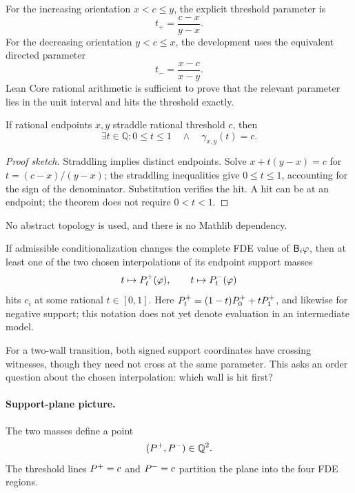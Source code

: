 For the increasing orientation \(x<c\le y\), the explicit threshold parameter is
\[
  t_+=\frac{c-x}{y-x}.
\]
For the decreasing orientation \(y<c\le x\), the development uses the equivalent directed parameter
\[
  t_- =\frac{x-c}{x-y}.
\]
Lean Core rational arithmetic is sufficient to prove that the relevant parameter lies in the unit interval and hits the threshold exactly.

\begin{theorem}
If rational endpoints \(x,y\) straddle rational threshold \(c\), then
\[
  \exists t\in\mathbb{Q}:
  0\le t\le 1
  \quad\land\quad
  \gamma_{x,y}(t)=c.
\]
\statusverified
\end{theorem}

\begin{proof}[Proof sketch]
Straddling implies distinct endpoints. Solve \(x+t(y-x)=c\) for \(t=(c-x)/(y-x)\); the straddling inequalities give \(0\le t\le1\), accounting for the sign of the denominator. Substitution verifies the hit. A hit can be at an endpoint; the theorem does not require \(0<t<1\).
\end{proof}
No abstract topology is used, and there is no Mathlib dependency.

\begin{corollary}
If admissible conditionalization changes the complete FDE value of \(\mathsf{B}_i\varphi\), then at least one of the two chosen interpolations of its endpoint support masses
\[
  t\mapsto P^{+}_t(\varphi),
  \qquad
  t\mapsto P^{-}_t(\varphi)
\]
hits \(c_i\) at some rational \(t\in[0,1]\). Here \(P^{+}_t=(1-t)P^{+}_0+tP^{+}_1\), and likewise for negative support; this notation does not yet denote evaluation in an intermediate model.
\statusverified
\end{corollary}

For a two-wall transition, both signed support coordinates have crossing witnesses, though they need not cross at the same parameter. This asks an order question about the chosen interpolation: which wall is hit first?

\paragraph{Support-plane picture.}
The two masses define a point
\[
  (P^{+},P^{-})\in\mathbb{Q}^2.
\]
The threshold lines \(P^{+}=c\) and \(P^{-}=c\) partition the plane into the four FDE regions.

\begin{center}
\end{center}


